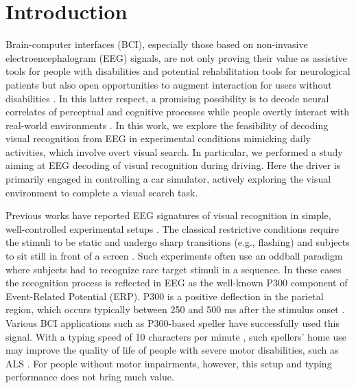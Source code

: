 \documentclass[12pt]{iopart}
\begin{document}
\section{Introduction}
\label{sec:intro}

Brain-computer interfaces (BCI), especially those based on 
non-invasive electroencephalogram (EEG) signals, are not only
proving their value as assistive tools for people 
with disabilities
\cite{birbaumer_spelling_1999,wolpaw_control_2004,holz_braincomputer_2013,leeb_towards_2015,saeedi_long-term_2017,perdikis_cybathlon_2018}
and potential rehabilitation tools for
neurological patients
\cite{ramos-murguialday_brain-machine-interface_2013,pichiorri_braincomputer_2015,biasiucci_brain-actuated_2018,cervera_braincomputer_2018}
but also open opportunities 
to augment interaction for users without disabilities \cite{zhang_eeg-based_2015,khaliliardali_action_2015,chavarriaga_decoding_2018}. In this
latter respect, a promising possibility is to decode neural
correlates of perceptual and cognitive processes while people
overtly interact with real-world environments
\cite{uscumlic_iterative_2013,jangraw_neurally_2014,haufe_electrophysiology-based_2014}.
In this work, we explore the feasibility of decoding visual recognition
from EEG in experimental conditions mimicking
daily activities, which involve overt visual search. In particular,
we performed a study aiming at EEG decoding of visual recognition
during driving. Here the driver is primarily engaged in controlling a car simulator,
actively exploring the visual environment to complete a visual search task.

Previous works have reported EEG signatures of visual recognition in simple, well-controlled experimental setups
\cite{gerson_cortically_2006,krusienski_toward_2008,rosenthal_evoked_2014,jangraw_neurally_2014}.
The classical restrictive conditions require
the stimuli to be static and undergo sharp
transitions (e.g., flashing) and
subjects to sit still in front of a screen \cite{krusienski_toward_2008}. 
Such experiments often use an oddball paradigm 
where subjects had to recognize
rare target stimuli in a sequence. In these cases the recognition process
is reflected in EEG as the well-known P300 component of Event-Related Potential (ERP).
P300 is a positive deflection in the parietal region, which occurs
typically between 250 and 500 ms after the stimulus onset \cite{polich_updating_2007}.
Various BCI applications such as P300-based speller have successfully used
this signal.
With a typing speed of 10 characters per minute \cite{rezeika_braincomputer_2018},
such spellers' home use may improve the quality of life
of people with severe motor disabilities, such as ALS
\cite{sellers_brain-computer_2010,holz_long-term_2015,wolpaw_independent_2018}.
For people without motor impairments, however, this setup and typing performance does not bring much value.
\end{document}
